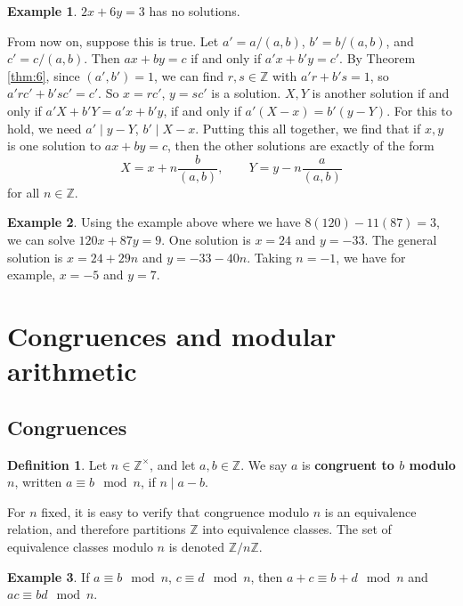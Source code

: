 \documentclass{article}
\newcommand{\Z}{\mathbb{Z}}
\newcommand{\rb}[1]{\left( #1 \right)}
\theoremstyle{definition}\newtheorem{definition}{Definition}
\theoremstyle{definition}\newtheorem{remark}[definition]{Remark}
\theoremstyle{definition}\newtheorem*{example}{Example}
\theoremstyle{definition}\newtheorem*{note}{Note}
\begin{document}
\begin{example}
$ 2x + 6y = 3 $ has no solutions.
\end{example}

From now on, suppose this is true. Let $ a' = a / \rb{a, b} $, $ b' = b / \rb{a, b} $, and $ c' = c / \rb{a, b} $. Then $ ax + by = c $ if and only if $ a'x + b'y = c' $. By Theorem \ref{thm:6}, since $ \rb{a', b'} = 1 $, we can find $ r, s \in \Z $ with $ a'r + b's = 1 $, so $ a'rc' + b'sc' = c' $. So $ x = rc' $, $ y = sc' $ is a solution. $ X, Y $ is another solution if and only if $ a'X + b'Y = a'x + b'y $, if and only if $ a'\rb{X - x} = b'\rb{y - Y} $. For this to hold, we need $ a' \mid y - Y $, $ b' \mid X - x $. Putting this all together, we find that if $ x, y $ is one solution to $ ax + by = c $, then the other solutions are exactly of the form
$$ X = x + n\dfrac{b}{\rb{a, b}}, \qquad Y = y - n\dfrac{a}{\rb{a, b}} $$
for all $ n \in \Z $.

\begin{example}
Using the example above where we have $ 8\rb{120} - 11\rb{87} = 3 $, we can solve $ 120x + 87y = 9 $. One solution is $ x = 24 $ and $ y = -33 $. The general solution is $ x = 24 + 29n $ and $ y = -33 - 40n $. Taking $ n = -1 $, we have for example, $ x = -5 $ and $ y = 7 $.
\end{example}

\section{Congruences and modular arithmetic}

\subsection{Congruences}

\begin{definition}
Let $ n \in \Z^\times $, and let $ a, b \in \Z $. We say $ a $ is \textbf{congruent to $ b $ modulo $ n $}, written $ a \equiv b \mod n $, if $ n \mid a - b $.
\end{definition}

For $ n $ fixed, it is easy to verify that congruence modulo $ n $ is an equivalence relation, and therefore partitions $ \Z $ into equivalence classes. The set of equivalence classes modulo $ n $ is denoted $ \Z / n\Z $.

\begin{example}
If $ a \equiv b \mod n $, $ c \equiv d \mod n $, then $ a + c \equiv b + d \mod n $ and $ ac \equiv bd \mod n $.
\end{example}
\end{document}
